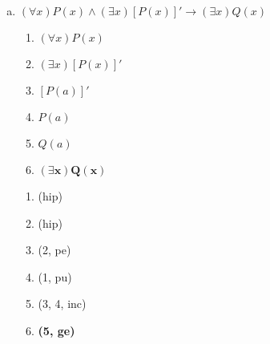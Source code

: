 \begin{Gabarito}{5}
\begin{enumerate}[a)]
\begin{multicols}{2}
              \columnbreak

              \begin{enumerate}[\ding{32}]
                \item (hip)
                \item (1, pe)
                \item (2, pe)
                \item (3, ge)
                \item \textbf{(4, ge)}
              \end{enumerate}

            \end{multicols}

      \item $(\forall x)P(x) \land (\exists x)[P(x)]' \rightarrow (\exists x)Q(x)$
            \begin{multicols}{2}

              \begin{enumerate}[1.]
                \item $(\forall x)P(x)$
                \item $(\exists x)[P(x)]'$
                \item $[P(a)]'$
                \item $P(a)$
                \item $Q(a)$
                \item $\boldsymbol{(\exists x)Q(x)}$
              \end{enumerate}

              \columnbreak

              \begin{enumerate}[\ding{32}]
                \item (hip)
                \item (hip)
                \item (2, pe)
                \item (1, pu)
                \item (3, 4, inc)
                \item \textbf{(5, ge)}
              \end{enumerate}

            \end{multicols}
    \end{enumerate}
  
\end{Gabarito}
